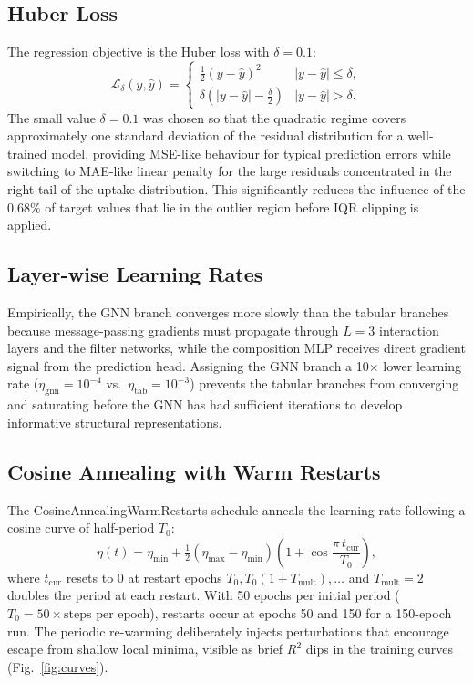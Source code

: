 \documentclass[conference]{IEEEtran}
\begin{document}
\subsection{Huber Loss}

The regression objective is the Huber loss with $\delta=0.1$:
\begin{equation}
  \mathcal{L}_\delta(y,\hat{y}) =
  \begin{cases}
    \tfrac{1}{2}(y-\hat{y})^2
      & |y-\hat{y}| \leq \delta,\\
    \delta\!\left(|y-\hat{y}|-\tfrac{\delta}{2}\right)
      & |y-\hat{y}| > \delta.
  \end{cases}
  \label{eq:huber}
\end{equation}
The small value $\delta=0.1$ was chosen so that the quadratic regime
covers approximately one standard deviation of the residual distribution
for a well-trained model, providing MSE-like behaviour for typical
prediction errors while switching to MAE-like linear penalty for the
large residuals concentrated in the right tail of the uptake distribution.
This significantly reduces the influence of the 0.68\% of target values
that lie in the outlier region before IQR clipping is applied.

\subsection{Layer-wise Learning Rates}

Empirically, the GNN branch converges more slowly than the tabular branches
because message-passing gradients must propagate through $L=3$ interaction
layers and the filter networks, while the composition MLP receives direct
gradient signal from the prediction head.  Assigning the GNN branch a 10$\times$
lower learning rate ($\eta_{\text{gnn}}=10^{-4}$ vs.\ $\eta_{\text{tab}}=10^{-3}$)
prevents the tabular branches from converging and saturating before the GNN
has had sufficient iterations to develop informative structural representations.

\subsection{Cosine Annealing with Warm Restarts}

The CosineAnnealingWarmRestarts schedule \cite{adamw2019} anneals the
learning rate following a cosine curve of half-period $T_0$:
\begin{equation}
  \eta(t) = \eta_{\min} + \tfrac{1}{2}(\eta_{\max}-\eta_{\min})
            \!\left(1+\cos\!\frac{\pi\,t_{\text{cur}}}{T_0}\right),
  \label{eq:cawr}
\end{equation}
where $t_{\text{cur}}$ resets to 0 at restart epochs $T_0, T_0(1+T_{\text{mult}}),\ldots$
and $T_{\text{mult}}=2$ doubles the period at each restart.
With 50 epochs per initial period ($T_0 = 50\times\text{steps per epoch}$),
restarts occur at epochs 50 and 150 for a 150-epoch run.
The periodic re-warming deliberately injects perturbations that encourage
escape from shallow local minima, visible as brief $R^2$ dips in the
training curves (Fig.~\ref{fig:curves}).
\end{document}
